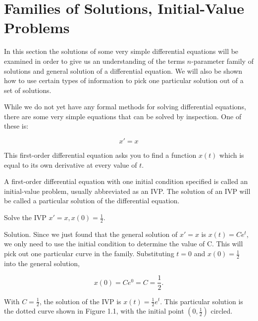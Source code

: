 \section{Families of Solutions, Initial-Value Problems}
  In this section the solutions of some very simple differential equations will be examined in order to give us an understanding of the terms $n$-parameter family of solutions and general solution of a differential equation. We will also be shown how to use certain types of information to pick one particular solution out of a set of solutions.

  While we do not yet have any formal methods for solving differential equations, there are some very simple equations that can be solved by inspection. One of these is:

  \begin{equation}
    x' = x
  \end{equation}

  This first-order differential equation asks you to find a function $x(t)$ which is equal to its own derivative at every value of $t$.

  \begin{definition}
    A first-order differential equation with one initial condition specified is called an initial-value problem, usually abbreviated as an IVP. The solution of an IVP will be called a particular solution of the differential equation.
  \end{definition}

  \begin{problem}
    Solve the IVP $x'=x, x(0)=\frac{1}{2}$.

    Solution. Since we just found that the general solution of $x'=x$ is $x(t)=Ce^t$, we only need to use the initial condition to determine the value of C. This will pick out one particular curve in the family. Substituting $t=0$ and $x(0)=\frac{1}{2}$ into the general solution,

    \begin{equation}
      x(0)=Ce^0=C=\frac{1}{2}.
    \end{equation}

    With $C=\frac{1}{2}$, the solution of the IVP is $x(t)=\frac{1}{2}e^t$. This particular solution is the dotted curve shown in Figure 1.1, with the initial point $(0,\frac{1}{2})$ circled.
  \end{problem}